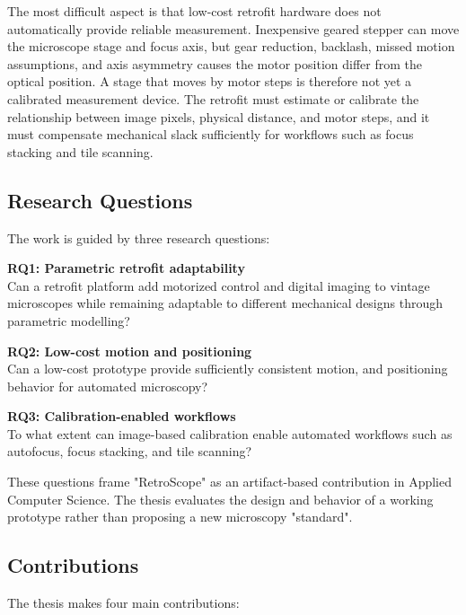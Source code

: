 The most difficult aspect is that low-cost retrofit hardware does not automatically provide reliable measurement. Inexpensive geared stepper can move the microscope stage and focus axis, but gear reduction, backlash, missed motion assumptions, and axis asymmetry causes the motor position differ from the optical position. A stage that moves by motor steps is therefore not yet a calibrated measurement device. The retrofit must estimate or calibrate the relationship between image pixels, physical distance, and motor steps, and it must compensate mechanical slack sufficiently for workflows such as focus stacking and tile scanning.

\clearpage

\subsection{Research Questions}

The work is guided by three research questions:

\begin{description}
    \item \textbf{RQ1: Parametric retrofit adaptability}\\
    Can a retrofit platform add motorized control and digital imaging to vintage microscopes while remaining adaptable to different mechanical designs through parametric modelling?
    \item \textbf{RQ2: Low-cost motion and positioning}\\
    Can a low-cost prototype provide sufficiently consistent motion, and positioning behavior for automated microscopy?
    \item \textbf{RQ3: Calibration-enabled workflows}\\
    To what extent can image-based calibration enable automated workflows such as autofocus, focus stacking, and tile scanning?
\end{description}

These questions frame "RetroScope" as an artifact-based contribution in Applied Computer Science. The thesis evaluates the design and behavior of a working prototype rather than proposing a new microscopy "standard".

\subsection{Contributions}

The thesis makes four main contributions:

